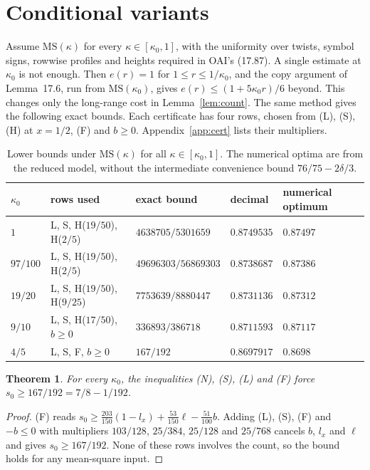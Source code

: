 \documentclass[11pt]{article}
\newtheorem{theorem}{Theorem}
\theoremstyle{remark}\newtheorem*{remark}{Remark}
\begin{document}
\section{Conditional variants}
Assume $\mathrm{MS}(\kappa)$ for every $\kappa\in[\kappa_0,1]$, with the uniformity over twists, symbol
signs, rowwise profiles and heights required in OAI's (17.87). A single estimate at $\kappa_0$ is not
enough. Then $e(r)=1$ for $1\le r\le1/\kappa_0$, and the copy argument of Lemma~17.6, run from
$\mathrm{MS}(\kappa_0)$, gives $e(r)\le(1+5\kappa_0r)/6$ beyond. This changes only the long-range cost in
Lemma~\ref{lem:count}. The same method gives the following exact bounds. Each certificate has four
rows, chosen from (L), (S), (H) at $x=1/2$, (F) and $b\ge0$. Appendix~\ref{app:cert} lists their
multipliers.
\begin{table}[h]\centering
\begin{tabular}{lllll}\toprule
$\kappa_0$ & rows used & exact bound & decimal & numerical optimum\\\midrule
$1$ & L, S, H($19/50$), H($2/5$) & $4638705/5301659$ & $0.8749535$ & $0.87497$\\
$97/100$ & L, S, H($19/50$), H($2/5$) & $49696303/56869303$ & $0.8738687$ & $0.87386$\\
$19/20$ & L, S, H($19/50$), H($9/25$) & $7753639/8880447$ & $0.8731136$ & $0.87312$\\
$9/10$ & L, S, H($17/50$), $b\ge0$ & $336893/386718$ & $0.8711593$ & $0.87117$\\
$4/5$ & L, S, F, $b\ge0$ & $167/192$ & $0.8697917$ & $0.8698$\\\bottomrule
\end{tabular}
\caption{Lower bounds under $\mathrm{MS}(\kappa)$ for all $\kappa\in[\kappa_0,1]$. The numerical optima are from the reduced model,
without the intermediate convenience bound $76/75-2\delta/3$.}
\end{table}

\begin{theorem}
For every $\kappa_0$, the inequalities (N), (S), (L) and (F) force $s_0\ge167/192=7/8-1/192$.
\end{theorem}
\begin{proof}
(F) reads $s_0\ge\frac{203}{150}(1-l_x)+\frac{53}{150}\ell-\frac{51}{100}b$. Adding (L), (S), (F)
and $-b\le0$ with multipliers $103/128$, $25/384$, $25/128$ and $25/768$ cancels $b$, $l_x$ and $\ell$
and gives $s_0\ge167/192$. None of these rows involves the count, so the bound holds for any
mean-square input.
\end{proof}
\end{document}

